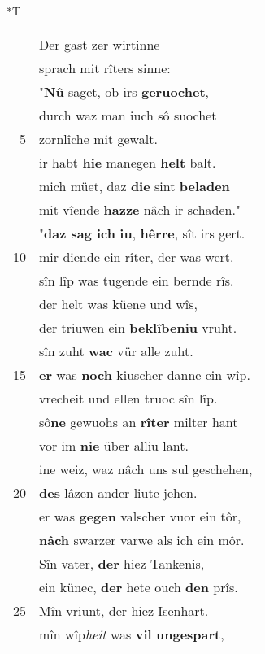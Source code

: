 \documentclass[8pt,a4paper,notitlepage]{article}
\begin{document}
\begin{table}[ht]
\begin{minipage}[t]{0.5\linewidth}
\end{minipage}
\hspace{0.5cm}
\begin{minipage}[t]{0.5\linewidth}
\small
\begin{center}*T
\end{center}
\begin{tabular}{rl}
 & Der gast zer wirtinne\\ 
 & sprach mit rîters sinne:\\ 
 & "\textbf{Nû} saget, ob irs \textbf{geruochet},\\ 
 & durch waz man iuch sô suochet\\ 
5 & zornlîche mit gewalt.\\ 
 & ir habt \textbf{hie} manegen \textbf{helt} balt.\\ 
 & mich müet, daz \textbf{die} sint \textbf{beladen}\\ 
 & mit vîende \textbf{hazze} nâch ir schaden."\\ 
 & "\textbf{daz sag ich} \textbf{iu}, \textbf{hêrre}, sît irs gert.\\ 
10 & mir diende ein rîter, der was wert.\\ 
 & sîn lîp was tugende ein bernde rîs.\\ 
 & der helt was küene und wîs,\\ 
 & der triuwen ein \textbf{beklîbeniu} vruht.\\ 
 & sîn zuht \textbf{wac} vür alle zuht.\\ 
15 & \textbf{er} was \textbf{noch} kiuscher danne ein wîp.\\ 
 & vrecheit und ellen truoc sîn lîp.\\ 
 & sô\textbf{ne} gewuohs an \textbf{rîter} milter hant\\ 
 & vor im \textbf{nie} über alliu lant.\\ 
 & ine weiz, waz nâch uns sul geschehen,\\ 
20 & \textbf{des} lâzen ander liute jehen.\\ 
 & er was \textbf{gegen} valscher vuor ein tôr,\\ 
 & \textbf{nâch} swarzer varwe als ich ein môr.\\ 
 & Sîn vater, \textbf{der} hiez Tankenis,\\ 
 & ein künec, \textbf{der} hete ouch \textbf{den} prîs.\\ 
25 & Mîn vriunt, der hiez Isenhart.\\ 
 & mîn wîp\textit{heit} was \textbf{vil} \textbf{ungespart},\\ 

\end{tabular}
\end{minipage}
\end{table}
\end{document}

